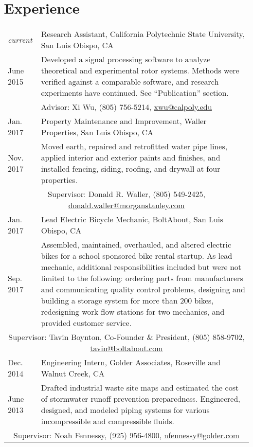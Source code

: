 \documentclass[10pt]{article} %
\newcommand{\catspace}{.4em}
\begin{document}
\section{Experience}

	\begin{tabular}{p{.6in}|p{5.5in}}
		\emph{current}& Research Assistant, California Polytechnic State University, San Luis Obispo, CA \\
		June 2015& \footnotesize{Developed a signal processing software to analyze theoretical and experimental rotor systems. Methods were verified against a comparable software, and research experiments have continued. See ``Publication'' section.}\\
		\multicolumn{2}{c}{\footnotesize{\hfill Advisor: Xi Wu, (805) 756-5214, \href{mailto:xwu@calpoly.edu}{xwu@calpoly.edu}}} \\	[\catspace]	
		
		Jan. 2017& Property Maintenance and Improvement, Waller Properties, San Luis Obispo, CA\\
		Nov. 2017& \footnotesize{Moved earth, repaired and retrofitted water pipe lines, applied interior and exterior paints and finishes, and installed fencing, siding, roofing, and drywall at four properties.}\\
		\multicolumn{2}{c}{\footnotesize{ \hfill Supervisor: Donald R. Waller, (805) 549-2425, \href{mailto:donald.waller@morganstanley.com}{donald.waller@morganstanley.com}}} \\[\catspace]
		
		Jan. 2017& Lead Electric Bicycle Mechanic, BoltAbout, San Luis Obispo, CA\\
		Sep. 2017& \footnotesize{Assembled, maintained, overhauled, and altered electric bikes for a school sponsored bike rental startup. As lead mechanic, additional responsibilities included but were not limited to the following: ordering parts from manufacturers and communicating quality control problems, designing and building a storage system for more than 200 bikes, redesigning work-flow stations for two mechanics, and provided customer service.}\\
		\multicolumn{2}{c}{\footnotesize{\hfill Supervisor: Tavin Boynton, Co-Founder \& President, (805) 858-9702, \href{mailto:tavin@boltabout.com}{tavin@boltabout.com}}} \\[\catspace]
		
		Dec. 2014& Engineering Intern, Golder Associates, Roseville and Walnut Creek, CA \\
		June 2013&\footnotesize{ Drafted industrial waste site maps and estimated the cost of stormwater runoff prevention preparedness. Engineered, designed, and modeled piping systems for various incompressible and compressible fluids. }\\
		\multicolumn{2}{c}{\footnotesize{\hfill Supervisor: Noah Fennessy, (925) 956-4800, \href{nfennessy@golder.com}{nfennessy@golder.com}}} \\	[\catspace]	
		

\end{tabular}
\end{document}
